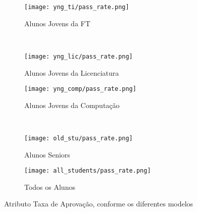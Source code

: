 \clearpage
\begin{figure}[!ht]
    \centering
    \begin{subfigure}[b]{0.48\textwidth}
        \centering
        \texttt{[image: yng\_ti/pass\_rate.png]}
        \caption{Alunos Jovens da FT}
    \end{subfigure}
    ~
    \begin{subfigure}[b]{0.48\textwidth}
        \centering
        \texttt{[image: yng\_lic/pass\_rate.png]}
        \caption{Alunos Jovens da Licenciatura}
    \end{subfigure}

    \begin{subfigure}[b]{0.48\textwidth}
        \centering
        \texttt{[image: yng\_comp/pass\_rate.png]}
        \caption{Alunos Jovens da Computação}
    \end{subfigure}
    ~
    \begin{subfigure}[b]{0.48\textwidth}
        \centering
        \texttt{[image: old\_stu/pass\_rate.png]}
        \caption{Alunos Seniors}
    \end{subfigure}

    \begin{subfigure}[b]{0.48\textwidth}
        \centering
        \texttt{[image: all\_students/pass\_rate.png]}
        \caption{Todos os Alunos}
    \end{subfigure}
    \caption{Atributo Taxa de Aprovação, conforme os diferentes modelos}
\end{figure}

